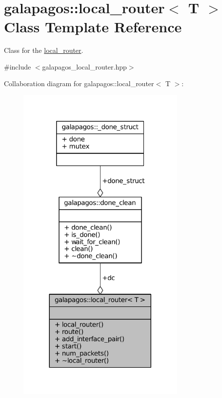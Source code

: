 \hypertarget{classgalapagos_1_1local__router}{}\section{galapagos\+:\+:local\+\_\+router$<$ T $>$ Class Template Reference}
\label{classgalapagos_1_1local__router}


Class for the \hyperlink{classgalapagos_1_1local__router}{local\+\_\+router}.  




{\ttfamily \#include $<$galapagos\+\_\+local\+\_\+router.\+hpp$>$}



Collaboration diagram for galapagos\+:\+:local\+\_\+router$<$ T $>$\+:
\nopagebreak
\begin{figure}[H]
\begin{center}
\leavevmode
\includegraphics[width=236pt]{classgalapagos_1_1local__router__coll__graph}
\end{center}
\end{figure}
